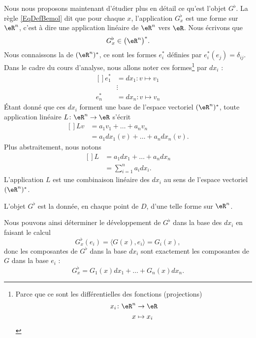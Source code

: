 Nous nous proposons maintenant d'étudier plus en détail ce qu'est l'objet $G^{\flat}$. La règle \eqref{EqDefBemol} dit que pour chaque $x$, l'application $G_x^{\flat}$ est une forme sur $\eR^n$, c'est à dire une application linéaire de $\eR^n$ vers $\eR$. Nous écrivons que
\begin{equation}
	G_x^{\flat}\in\big( \eR^n \big)^*.
\end{equation}
Nous connaissons la  de $(\eR^n)^*$, ce sont les formes $e^*_i$ définies par $e^*_i(e_j)=\delta_{ij}$. Dans le cadre du cours d'analyse, nous allons noter ces formes\footnote{Parce que ce sont les différentielles des fonctions (projections)
\begin{equation}
	\begin{aligned}
			x_i\colon \eR^n&\to \eR \\
			x&\mapsto x_i 
		\end{aligned}
	\end{equation}
}
par $dx_i$ :
\begin{equation}
	\begin{aligned}[]
		e^*_1&=dx_1\colon v\mapsto v_1	\\
			&\vdots			\\
		e^*_n&=dx_n\colon v\mapsto v_n
	\end{aligned}
\end{equation}
Étant donné que ces $dx_i$ forment une base de l'espace vectoriel $(\eR^n)^*$, toute application linéaire $L\colon \eR^n\to \eR$ s'écrit
\begin{equation}
	\begin{aligned}[]
		Lv&=a_1v_1+\ldots+a_nv_n\\
			&=a_1dx_1(v)+\ldots+a_ndx_n(v).
	\end{aligned}
\end{equation}
Plus abstraitement, nous notons
\begin{equation}
	\begin{aligned}[]
		L&=a_1dx_1+\ldots+a_ndx_n\\
		&=\sum_{i=1}^na_idx_i.
	\end{aligned}
\end{equation}
L'application $L$ est une combinaison linéaire des $dx_i$ au sens de l'espace vectoriel $(\eR^n)^*$.

L'objet $G^{\flat}$ est la donnée, en chaque point de $D$, d'une telle forme sur $\eR^n$. 

Nous pouvons ainsi déterminer le développement de $G^{\flat}$ dans la base des $dx_i$ en faisant le calcul
\begin{equation}
	G_x^{\flat}(e_i)=\langle G(x), e_i\rangle =G_i(x),
\end{equation}
donc les composantes de $G^{\flat}$ dans la base $dx_i$ sont exactement les composantes de $G$ dans la base $e_i$ :
\begin{equation}
	G^{\flat}_x=G_1(x)dx_1+\ldots+G_n(x)dx_n.
\end{equation}


